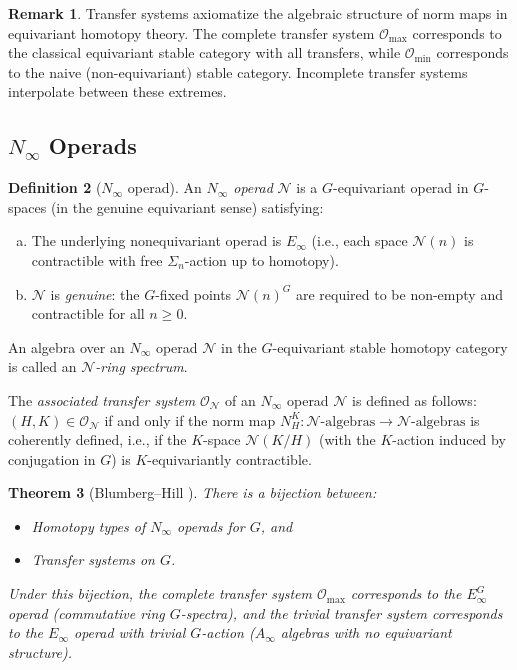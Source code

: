 \documentclass[12pt]{article}
\newtheorem{theorem}{Theorem}
\theoremstyle{definition}
\newtheorem{definition}[theorem]{Definition}
\newtheorem{remark}[theorem]{Remark}
\newcommand{\cO}{\mathcal{O}}
\begin{document}
\begin{remark}
Transfer systems axiomatize the algebraic structure of norm maps in equivariant homotopy theory.
The complete transfer system $\cO_{\max}$ corresponds to the classical equivariant stable category
with all transfers, while $\cO_{\min}$ corresponds to the naive (non-equivariant) stable category.
Incomplete transfer systems interpolate between these extremes.
\end{remark}

\subsection{$N_\infty$ Operads}

\begin{definition}[$N_\infty$ operad]
\label{def:Ninfty-operad}
An \emph{$N_\infty$ operad} $\mathcal{N}$ is a $G$-equivariant operad in $G$-spaces (in the
genuine equivariant sense) satisfying:
\begin{enumerate}[(a)]
  \item The underlying nonequivariant operad is $E_\infty$ (i.e., each space $\mathcal{N}(n)$ is
    contractible with free $\Sigma_n$-action up to homotopy).
  \item $\mathcal{N}$ is \emph{genuine}: the $G$-fixed points $\mathcal{N}(n)^G$ are required to be
    non-empty and contractible for all $n \geq 0$.
\end{enumerate}
An algebra over an $N_\infty$ operad $\mathcal{N}$ in the $G$-equivariant stable homotopy category
is called an \emph{$\mathcal{N}$-ring spectrum}.

The \emph{associated transfer system} $\cO_{\mathcal{N}}$ of an $N_\infty$ operad $\mathcal{N}$ is
defined as follows: $(H,K) \in \cO_{\mathcal{N}}$ if and only if the norm map
$N_H^K : \mathcal{N}\text{-algebras} \to \mathcal{N}\text{-algebras}$ is coherently defined, i.e.,
if the $K$-space $\mathcal{N}(K/H)$ (with the $K$-action induced by conjugation in $G$) is
$K$-equivariantly contractible.
\end{definition}

\begin{theorem}[Blumberg--Hill \cite{BlumbergHill}]
\label{thm:BH-classification}
There is a bijection between:
\begin{itemize}
  \item Homotopy types of $N_\infty$ operads for $G$, and
  \item Transfer systems on $G$.
\end{itemize}
Under this bijection, the complete transfer system $\cO_{\max}$ corresponds to the
$E_\infty^G$ operad (commutative ring $G$-spectra), and the trivial transfer system corresponds to
the $E_\infty$ operad with trivial $G$-action ($A_\infty$ algebras with no equivariant structure).
\end{theorem}
\end{document}

